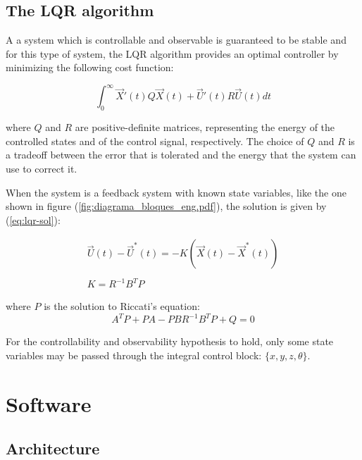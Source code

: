 \documentclass[conference]{IEEEtran}
\newcommand{\refp}[1]{(\ref{#1})}
\begin{document}
\subsection{The LQR algorithm}
\label{sec:lqr}

A a system which is controllable and observable is guaranteed to be stable and for this type of system, the LQR algorithm provides an optimal controller\cite{bib:lqrnotes} by minimizing the following cost function:

\begin{equation}
\label{eq:lqr}
\int_{0}^{\infty}  \vec{X}'(t)Q \vec{X}(t)+\vec{U}'(t)R\vec{U}(t)dt
\end{equation}

where $Q$ and $R$ are positive-definite matrices, representing the energy of the controlled states and of the control signal, respectively. The choice of $Q$ and $R$ is a tradeoff between the error that is tolerated and the energy that the system can use to correct it.

 When the system is a feedback system with known state variables, like the one shown in figure \refp{fig:diagrama_bloques_eng.pdf}, the solution is given by \refp{eq:lqr-sol}:

\begin{equation}
\begin{array}{c}
\vec{U}(t)-\vec{U}^*(t) = -K(\vec{X}(t)-\vec{X}^*(t))\\
\\
K = R^{-1}B^TP
\end{array}
\label{eq:lqr-sol}
\end{equation}

where $P$ is the solution to Riccati's equation:
\begin{equation}
  \label{eq:riccati}
  A^TP + PA - PBR^{-1}B^TP + Q = 0
\end{equation}

For the controllability and observability hypothesis to hold, only some state variables may be passed through the integral control block: $\{x,y,z,\theta\}$.

\section{Software}

\subsection{Architecture}
\label{sec:software-arch}
\end{document}
